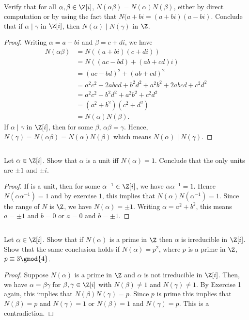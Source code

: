 \documentclass[letter,12pt]{article}
\author{\Author}
\title{\Title}
\newcommand{\Title}{Homework x}
\begin{document}
\maketitle
\pagestyle{fancy}
\fancyhead[L]{\Title}
\fancyhead[R]{\rightmark}
\subsection{} Verify that for all $\alpha,\beta\in \Z[i]$, $N(\alpha\beta)=N(\alpha)N(\beta)$, either by direct computation or by using the fact that $N(a+bi=(a+bi)(a-bi)$. Conclude that if $\alpha\mid\gamma$ in $\Z[i]$, then $N(\alpha)\mid N(\gamma)$ in $\Z$.
\begin{proof}
    Writing $\alpha=a+bi$ and $\beta=c+di$, we have
    \begin{align*}
        N(\alpha\beta)&=N((a+bi)(c+di))\\
                      &=N((ac-bd)+(ab+cd)i)\\
                      &=(ac-bd)^2+(ab+cd)^2\\
                      &=a^2c^2-2abcd+b^2d^2+a^2b^2+2abcd+c^2d^2\\
                      &=a^2c^2+b^2d^2+a^2b^2+c^2d^2\\
                      &=(a^2+b^2)(c^2+d^2)\\
                      &=N(\alpha)N(\beta).
    \end{align*}
    If $\alpha\mid \gamma$ in $\Z[i]$, then for some $\beta$, $\alpha\beta=\gamma$. Hence, $N(\gamma)=N(\alpha\beta)=N(\alpha)N(\beta)$ which means $N(\alpha)\mid N(\gamma)$.
\end{proof}

\subsection{} Let $\alpha\in \Z[i]$. Show that $\alpha$ is a unit iff $N(\alpha)=1$. Conclude that the only units are $\pm1$ and $\pm i$.
\begin{proof}
    If is a unit, then for some $\alpha ^{-1}\in \Z[i]$, we have $\alpha \alpha^{-1}=1$. Hence $N(\alpha\alpha^{-1})=1$ and by exercise $1$, this implies that $N(\alpha)N(\alpha^{-1})=1$. Since the range of $N$ is $\Z$, we have $N(\alpha)=\pm1$. Writing $\alpha=a^2+b^2$, this means $a=\pm 1$ and $b=0$ or $a=0$ and $b=\pm 1$.
\end{proof}

\subsection{} Let $\alpha\in \Z[i]$. Show that if $N(\alpha)$ is a prime in $\Z$ then $\alpha$ is irreducible in $\Z[i]$. Show that the same conclusion holds if $N(\alpha)=p^2$, where $p$ is a prime in $\Z$, $p\equiv 3\gmod{4}$.
\begin{proof}
    Suppose $N(\alpha)$ is a prime in $\Z$ and $\alpha$ is not irreducible in $\Z[i]$. Then, we have $\alpha=\beta\gamma$ for $\beta,\gamma\in \Z[i]$ with $N(\beta)\ne 1$ and $N(\gamma)\ne 1$. By Exercise 1 again, this implies that $N(\beta)N(\gamma)=p$. Since $p$ is prime this implies that $N(\beta)=p$ and $N(\gamma)=1$ or $N(\beta)=1$ and $N(\gamma)=p$. This is a contradiction.
\end{proof}
\end{document}
